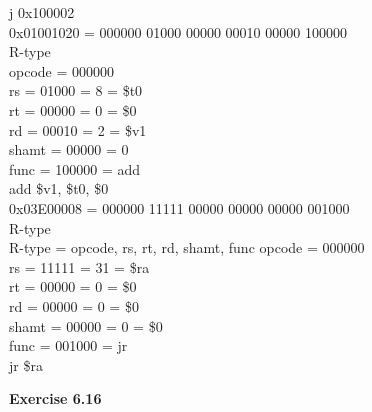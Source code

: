 \documentclass[12pt,a4paper]{report}
\begin{document}
\begin{normalsize}
j 0x100002 \\

0x01001020 = 000000 01000 00000 00010 00000 100000 \\
R-type \\
opcode = 000000 \\
rs = 01000 = 8 = \$t0 \\
rt = 00000 = 0 = \$0 \\
rd = 00010 = 2 = \$v1  \\
shamt = 00000 = 0 \\
func = 100000 = add \\

add \$v1, \$t0, \$0 \\

0x03E00008 = 000000 11111 00000 00000 00000 001000 \\
R-type \\
R-type = opcode, rs, rt, rd, shamt, func
opcode = 000000 \\
rs = 11111 = 31 = \$ra \\
rt = 00000 = 0 = \$0 \\
rd = 00000 = 0 = \$0 \\
shamt = 00000 = 0 = \$0 \\
func = 001000 = jr \\

jr \$ra \\

\medskip

\textbf{Exercise 6.16} \\




\end{normalsize}
\end{document}
